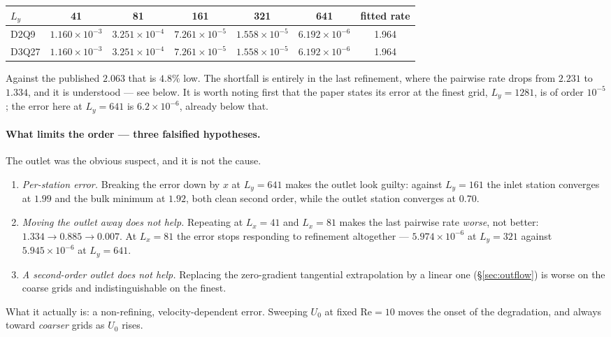 \documentclass[11pt,a4paper]{article}
\newcommand{\e}[1]{\times 10^{#1}}
\begin{document}
\begin{center}\small
\begin{tabular}{lccccc|c}
\toprule
$L_y$ & 41 & 81 & 161 & 321 & 641 & fitted rate \\
\midrule
D2Q9  & $1.160\e{-3}$ & $3.251\e{-4}$ & $7.261\e{-5}$ & $1.558\e{-5}$ & $6.192\e{-6}$ & 1.964 \\
D3Q27 & $1.160\e{-3}$ & $3.251\e{-4}$ & $7.261\e{-5}$ & $1.558\e{-5}$ & $6.192\e{-6}$ & 1.964 \\
\bottomrule
\end{tabular}
\end{center}

\noindent Against the published $2.063$ that is $4.8\%$ low.
The shortfall is entirely in the last refinement, where the pairwise rate drops
from $2.231$ to $1.334$, and it is understood --- see below. It is worth noting
first that the paper states its error at the finest grid, $L_y = 1281$, is of
order $10^{-5}$; the error here at $L_y=641$ is $6.2\e{-6}$, already below that.

\paragraph{What limits the order --- three falsified hypotheses.} The outlet was
the obvious suspect, and it is not the cause.

\begin{enumerate}\itemsep2pt
\item \emph{Per-station error.} Breaking the error down by $x$ at $L_y=641$
      makes the outlet look guilty: against $L_y=161$ the inlet station
      converges at $1.99$ and the bulk minimum at $1.92$, both clean second
      order, while the outlet station converges at $0.70$.
\item \emph{Moving the outlet away does not help.} Repeating at $L_x=41$ and
      $L_x=81$ makes the last pairwise rate \emph{worse}, not better:
      $1.334 \to 0.885 \to 0.007$. At $L_x=81$ the error stops responding to
      refinement altogether --- $5.974\e{-6}$ at $L_y=321$ against
      $5.945\e{-6}$ at $L_y=641$.
\item \emph{A second-order outlet does not help.} Replacing the zero-gradient
      tangential extrapolation by a linear one (\S\ref{sec:outflow}) is worse on
      the coarse grids and indistinguishable on the finest.
\end{enumerate}

\noindent What it actually is: a non-refining, velocity-dependent error.
Sweeping $U_0$ at fixed $\mathrm{Re}=10$ moves the onset of the degradation, and
always toward \emph{coarser} grids as $U_0$ rises.
\end{document}
